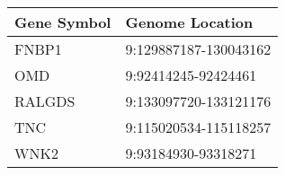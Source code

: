 \begin{tabular}{ll}
\toprule
Gene Symbol &       Genome Location \\
\midrule
      FNBP1 & 9:129887187-130043162 \\
        OMD &   9:92414245-92424461 \\
     RALGDS & 9:133097720-133121176 \\
        TNC & 9:115020534-115118257 \\
       WNK2 &   9:93184930-93318271 \\
\bottomrule
\end{tabular}
